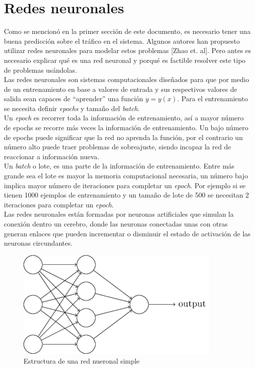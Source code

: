 \documentclass[12pt,spanish]{article}
\begin{document}
	\section{Redes neuronales}
	Como se mencionó en la primer sección de este documento, es necesario tener una buena predicción sobre el tráfico en el sistema. Algunos autores han propuesto utilizar redes neuronales para modelar estos problemas [Zhao et. al]. Pero antes es necesario explicar qué es una red neuronal y porqué es factible resolver este tipo de problemas usándolas.\\
	Las redes neuronales son sistemas computacionales diseñados para que por medio de un entrenamiento en base a valores de entrada y sus respectivos valores de salida sean capaces de ``aprender'' una función $ y = y(x) $. Para el entrenamiento se necesita definir \textit{epochs} y tamaño del \textit{batch}.\\
	Un \textit{epoch} es recorrer toda la información de entrenamiento, así a mayor número de epochs se recorre más veces la información de entrenamiento. Un bajo número de epochs puede significar que la red no aprenda la función, por el contrario un número alto puede traer problemas de sobreajuste, siendo incapaz la red de reaccionar a información nueva.\\
	Un \textit{batch} o lote, es una parte de la información de entrenamiento. Entre más grande sea el lote es mayor la memoria computacional necesaria, un número bajo implica mayor número de iteraciones para completar un \textit{epoch}. Por ejemplo si se tienen 1000 ejemplos de entrenamiento y un tamaño de lote de 500 se necesitan 2 iteraciones para completar un \textit{epoch}.\\
	Las redes neuronales están formadas por neuronas artificiales que simulan la conexión dentro un cerebro, donde las neuronas conectadas unas con otras generan enlaces que pueden incrementar o disminuir el estado de activación de las neuronas circundantes. 
	\begin{figure}[H]
		\centering
		\includegraphics[width=10cm]{Imagenes/neural_network_structure.png}
		\begin{centering}
			\caption{Estructura de una red nueronal simple}
		\end{centering}
	\end{figure}
	
\end{document}
